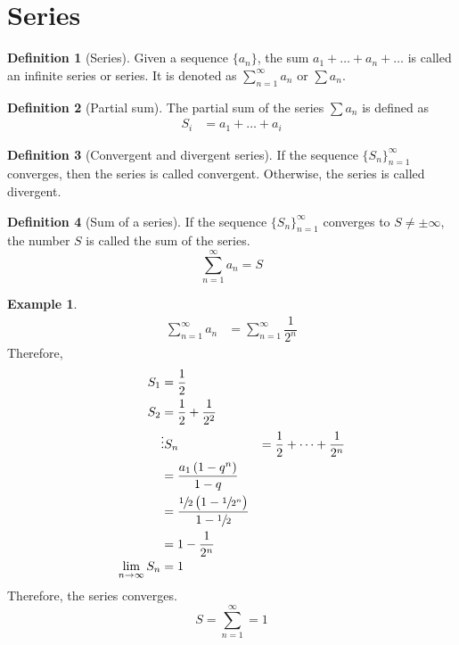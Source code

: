 \documentclass[fleqn, a4paper, 12pt, twoside]{article}
\theoremstyle{definition}
\newtheorem{example}{Example}
\newtheorem{definition}{Definition}
\theoremstyle{theorem}
\begin{document}
{\section{Series}

\begin{definition}[Series]
	Given a sequence $\{a_n\}$, the sum $a_1 + \dots + a_n + \dots$ is called an infinite series or series. It is denoted as $\sum_{n = 1}^{\infty} a_n$ or $\sum a_n$.
\end{definition}

\begin{definition}[Partial sum]
	The partial sum of the series $\sum a_n$ is defined as
	\begin{align*}
		S_i &= a_1 + \dots + a_i
	\end{align*}		
\end{definition}

\begin{definition}[Convergent and divergent series]
	If the sequence $\{S_n\}_{n = 1}^{\infty}$ converges, then the series is called convergent. Otherwise, the series is called divergent.
\end{definition}

\begin{definition}[Sum of a series]
	If the sequence $\{S_n\}_{n = 1}^{\infty}$ converges to $S \neq \pm \infty$, the number $S$ is called the sum of the series.
	\begin{equation*}
		\sum_{n = 1}^{\infty} a_n = S
	\end{equation*}
\end{definition}

\begin{example}
	\begin{align*}
		\sum_{n = 1}^{\infty} a_n &= \sum_{n = 1}^{\infty} \dfrac{1}{2^n}
	\end{align*}
	Therefore,
	\begin{align}
		S_1 &= \dfrac{1}{2}\\
		S_2 &= \dfrac{1}{2} + \dfrac{1}{2^2}\\
		&\vdots
		S_n &= \dfrac{1}{2} + \dots + \dfrac{1}{2^n}\\
		&= \dfrac{a_1 \left( 1 - q^n \right)}{1 - q}\\
		&= \dfrac{\sfrac{1}{2} \left( 1 - \sfrac{1}{2^n} \right)}{1 - \sfrac{1}{2}}\\
		&= 1 - \dfrac{1}{2^n}\\
		\lim\limits_{n \to \infty} S_n &= 1
	\end{align}
	Therefore, the series converges.
	\begin{equation*}
		S = \sum_{n = 1}^{\infty} = 1
	\end{equation*}
\end{example}

}
\end{document}
